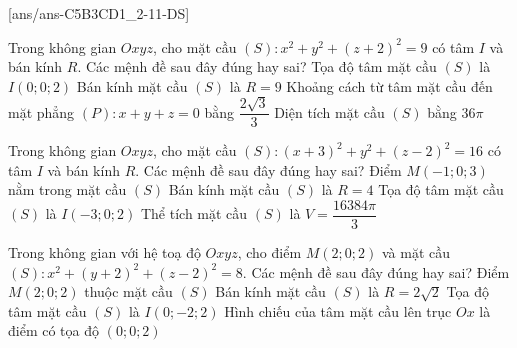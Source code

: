 \TNTF
{}[ans/ans-C5B3CD1_2-11-DS]

\begin{ex}%
	Trong không gian $Oxyz$, cho mặt cầu $(S)\colon x^2+y^2+(z+2)^2=9$ có tâm $I$ và bán kính $R$. Các mệnh đề sau đây đúng hay sai?
	\choiceTF
	{Tọa độ tâm mặt cầu $(S)$ là $I(0;0;2)$}
	{Bán kính mặt cầu $(S)$ là $R=9$}
	{\True Khoảng cách từ tâm mặt cầu đến mặt phẳng $(P)\colon x+y+z=0$ bằng $\dfrac{2\sqrt{3}}{3}$}
	{\True Diện tích mặt cầu $(S)$ bằng $36\pi$}
\end{ex}

\begin{ex}%
	Trong không gian $Oxyz$, cho mặt cầu $(S)\colon(x+3)^2+y^2+(z-2)^2=16$ có tâm $I$ và bán kính $R$. Các mệnh đề sau đây đúng hay sai?
	\choiceTF
	{\True Điểm $M(-1;0;3)$ nằm trong mặt cầu $(S)$}
	{\True Bán kính mặt cầu $(S)$ là $R=4$}
	{\True Tọa độ tâm mặt cầu $(S)$ là $I(-3;0;2)$}
	{Thể tích mặt cầu $(S)$ là $V=\dfrac{16384\pi}{3}$}
\end{ex}

\begin{ex}%
	Trong không gian với hệ toạ độ $Oxyz$, cho điểm $M(2;0;2)$ và mặt cầu $(S)\colon x^2+(y+2)^2+(z-2)^2=8$. Các mệnh đề sau đây đúng hay sai?
	\choiceTF
	{\True Điểm $M\left(2;0;2\right)$ thuộc mặt cầu $(S)$}
	{\True Bán kính mặt cầu $(S)$ là $R=2\sqrt{2}$}
	{\True Tọa độ tâm mặt cầu $(S)$ là $I\left(0;-2;2\right)$}
	{Hình chiếu của tâm mặt cầu lên trục $Ox$ là điểm có tọa độ $(0;0;2)$}
\end{ex}

